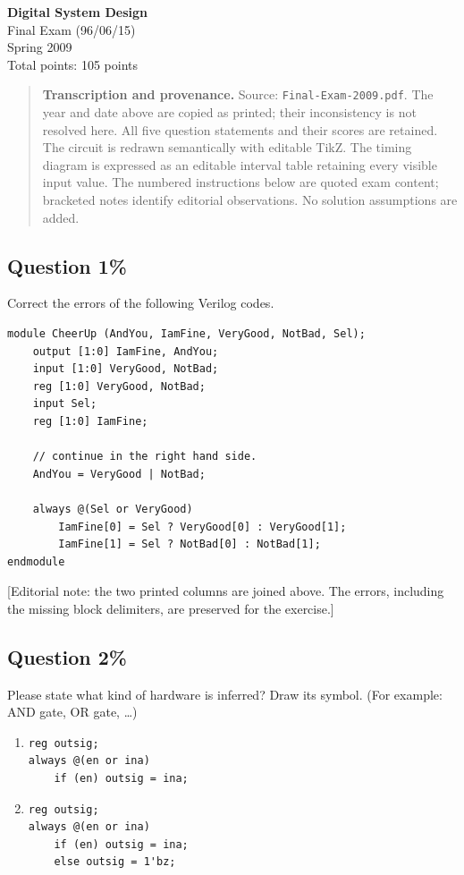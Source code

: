 \documentclass[11pt,a4paper]{article}
\newcommand{\question}[2]{\subsection*{Question #1\hfill\normalfont #2}}
\begin{document}
\begin{center}
  {\LARGE\bfseries Digital System Design}\\[5pt]
  {\large Final Exam (96/06/15)\\Spring 2009}\\[5pt]
  Total points: 105 points
\end{center}
\begin{quote}\small
\textbf{Transcription and provenance.} Source: \texttt{Final-Exam-2009.pdf}.
The year and date above are copied as printed; their inconsistency is not
resolved here. All five question statements and their scores are retained.
The circuit is redrawn semantically with editable TikZ. The timing diagram
is expressed as an editable interval table retaining every visible input
value. The numbered instructions below are quoted exam content; bracketed
notes identify editorial observations. No solution assumptions are added.
\end{quote}

\question{1}{15\%}
Correct the errors of the following Verilog codes.
\begin{lstlisting}
module CheerUp (AndYou, IamFine, VeryGood, NotBad, Sel);
    output [1:0] IamFine, AndYou;
    input [1:0] VeryGood, NotBad;
    reg [1:0] VeryGood, NotBad;
    input Sel;
    reg [1:0] IamFine;

    // continue in the right hand side.
    AndYou = VeryGood | NotBad;

    always @(Sel or VeryGood)
        IamFine[0] = Sel ? VeryGood[0] : VeryGood[1];
        IamFine[1] = Sel ? NotBad[0] : NotBad[1];
endmodule
\end{lstlisting}
{\small [Editorial note: the two printed columns are joined above. The errors,
including the missing block delimiters, are preserved for the exercise.]}

\question{2}{10\%}
Please state what kind of hardware is inferred? Draw its symbol.
(For example: AND gate, OR gate, \ldots)
\begin{enumerate}[label=(\alph*)]
\item
\begin{lstlisting}
reg outsig;
always @(en or ina)
    if (en) outsig = ina;
\end{lstlisting}
\item
\begin{lstlisting}
reg outsig;
always @(en or ina)
    if (en) outsig = ina;
    else outsig = 1'bz;
\end{lstlisting}
\end{enumerate}
\end{document}
